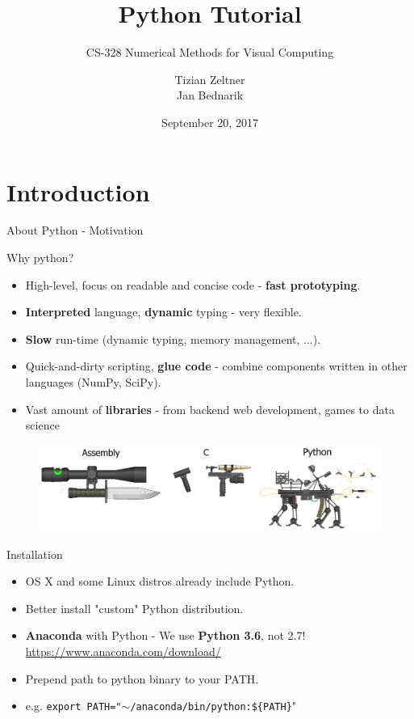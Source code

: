 \documentclass[10pt]{beamer}
\title{Python Tutorial}
\subtitle{CS-328 Numerical Methods for Visual Computing}
\date{September 20, 2017}
\author{Tizian Zeltner\\
	Jan Bednarik}
\begin{document}
	
	\maketitle
	
	
	\section{Introduction}
	
	\begin{frame}{About Python - Motivation}
	
	Why python?
	
	\begin{itemize}
		\item  High-level, focus on readable and concise code - \textbf{fast prototyping}.
		\item  \textbf{Interpreted} language, \textbf{dynamic} typing - very flexible.
		\item  \textbf{Slow} run-time (dynamic typing, memory management, ...).
		\item  Quick-and-dirty scripting, \textbf{glue code} - combine components written in other languages (NumPy, SciPy).
		\item  Vast amount of \textbf{libraries} - from backend web development, games to data science
	\end{itemize}
	
	
	\begin{figure}[!h]
		\centering
		\includegraphics[width=0.9\linewidth]{img/python_vs_others.png}
	\end{figure}
	
\end{frame}


\begin{frame}{Installation}

\begin{itemize}
	\item  OS X and some Linux distros already include Python.
	\item  Better install "custom" Python distribution.
	\item  \textbf{Anaconda} with Python - We use \textbf{Python 3.6}, not 2.7! \url{https://www.anaconda.com/download/}
	\item  Prepend path to python binary to your PATH.
	\item[] e.g. \small{\texttt{export PATH="$\sim$/anaconda/bin/python:\$\{PATH\}}"}
\end{itemize}

\end{frame}
\end{document}
